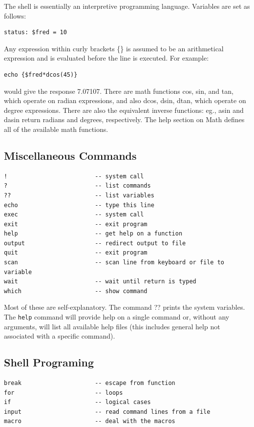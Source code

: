 \documentclass{article}
\begin{document}
The shell is essentially an interpretive programming language.
Variables are set as follows:
\begin{verbatim}
status: $fred = 10
\end{verbatim}
Any expression within curly brackets \{\} is assumed
to be an arithmetical expression and is evaluated before the line is
executed.  For example:
\begin{verbatim}
echo {$fred*dcos(45)}
\end{verbatim}
would give the response 7.07107.  There are math functions cos, sin,
and tan, which operate on radian expressions, and also dcos, dsin,
dtan, which operate on degree expressions.  There are also the
equivalent inverse functions: eg., asin and dasin return radians and
degrees, respectively.  The help section on Math defines all of the
available math functions.  

\subsection{Miscellaneous Commands}
\begin{verbatim}
!                         -- system call
?                         -- list commands 
??                        -- list variables 
echo                      -- type this line 
exec                      -- system call
exit                      -- exit program 
help                      -- get help on a function 
output                    -- redirect output to file
quit                      -- exit program 
scan                      -- scan line from keyboard or file to variable 
wait                      -- wait until return is typed
which                     -- show command 
\end{verbatim}
Most of these are self-explanatory.  The command ?? prints the system
variables.  The {\tt help} command will provide help on a single
command or, without any arguments, will list all available help
files (this includes general help not associated with a specific
command).  

\subsection{Shell Programing}
\begin{verbatim}
break                     -- escape from function 
for                       -- loops 
if                        -- logical cases 
input                     -- read command lines from a file 
macro                     -- deal with the macros 
\end{verbatim}
\end{document}
